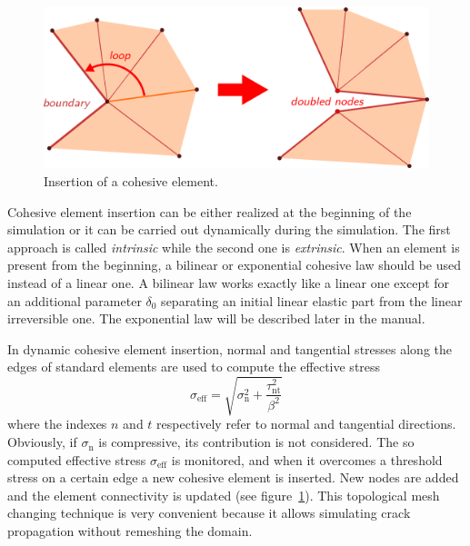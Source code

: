 \begin{figure}
  \centering
  \includegraphics[width=.8\textwidth]{figures/insertion}
  \caption{Insertion of a cohesive element.}
  \label{fig:smm:coh:insertion}
\end{figure}

Cohesive element insertion can be either realized at the beginning of
the simulation or it can be carried out dynamically during the
simulation. The first approach is called \emph{intrinsic} while the
second one is \emph{extrinsic}. When an element is present from the
beginning, a bilinear or exponential cohesive law should be used
instead of a linear one. A bilinear law works exactly like a linear
one except for an additional parameter $\delta_0$ separating an
initial linear elastic part from the linear irreversible one. The
exponential law will be described later in the manual.

In dynamic cohesive element insertion, normal and tangential stresses
along the edges of standard elements are used to compute the effective
stress
\begin{equation}
  \sigma_\mathrm{eff} = \sqrt{\sigma_\mathrm{n}^2 +
    \frac{\tau_\mathrm{nt}^2}{\beta^2}}
\end{equation}
where the indexes $n$ and $t$ respectively refer to normal and
tangential directions. Obviously, if $\sigma_\mathrm{n}$ is
compressive, its contribution is not considered. The so computed
effective stress $\sigma_\mathrm{eff}$ is monitored, and when it
overcomes a threshold stress on a certain edge a new cohesive element
is inserted. New nodes are added and the element connectivity is
updated (see figure~\ref{fig:smm:coh:insertion}). This topological
mesh changing technique is very convenient because it allows
simulating crack propagation without remeshing the domain.

